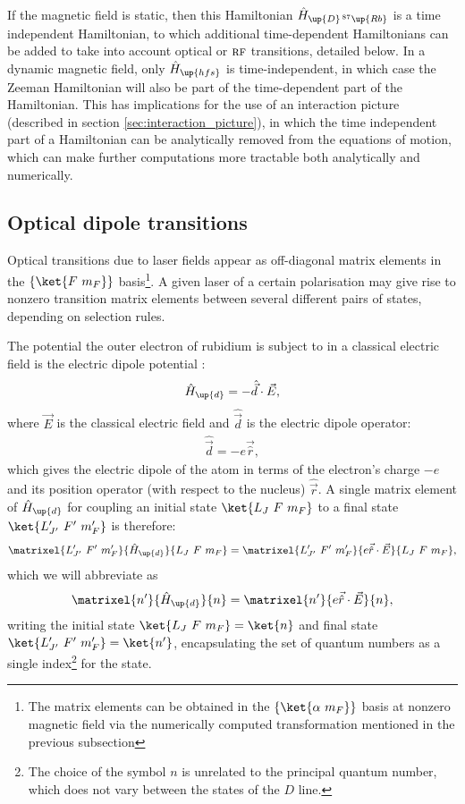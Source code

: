 If the magnetic field is static, then this Hamiltonian $\hat{H}_{\up{D}\,^{87}\up{Rb}}$ is a time independent Hamiltonian, to which additional time-dependent Hamiltonians can be added to take into account optical or $\textsc{rf}$ transitions, detailed below. In a dynamic magnetic field, only $\hat H_\up{hfs}$ is time-independent, in which case the Zeeman Hamiltonian will also be part of the time-dependent part of the Hamiltonian. This has implications for the use of an interaction picture (described in section \ref{sec:interaction_picture}), in which the time independent part of a Hamiltonian can be analytically removed from the equations of motion, which can make further computations more tractable both analytically and numerically.

\subsection{Optical dipole transitions}\label{sec:optical_dipole_transitions}

Optical transitions due to laser fields appear as off-diagonal matrix elements in the $\{\ket{F\ m_F}\}$ basis\footnote{The matrix elements can be obtained in the $\{\ket{\alpha\ m_F}\}$ basis at nonzero magnetic field via the numerically computed transformation mentioned in the previous subsection}. A given laser of a certain polarisation may give rise to nonzero transition matrix elements between several different pairs of states, depending on selection rules.

The potential the outer electron of rubidium is subject to in a classical electric field is the electric dipole potential \cite{metcalf_laser_1999, steck_quantum_2017}:
\begin{align}
\hat H_\up{d} = -\hat{\vec d}\cdot\vec E,
\end{align}
where $\vec E$ is the classical electric field and $\hat{\vec d}$ is the electric dipole operator:
\begin{align}
\hat{\vec d} = -e\vec{\hat r},
\end{align}
which gives the electric dipole of the atom in terms of the electron's charge $-e$ and its position operator (with respect to the nucleus) $\hat{\vec r}$. A single matrix element of $\hat H_\up{d}$ for coupling an initial state $\ket{L_J\ F\ m_F}$ to a final state $\ket{L^\prime_{J^\prime}\ F^\prime\ m_F^\prime}$ is therefore:
\begin{align}\label{eq:electric_dipole_potential}
\matrixel{L^\prime_{J^\prime}\ F^\prime\ m_F^\prime}{\hat H_\up{d}}{L_J\ F\ m_F} = 
\matrixel{L^\prime_{J^\prime}\ F^\prime\ m_F^\prime}{e\vec{\hat r}\cdot\vec E}{L_J\ F\ m_F},
\end{align}
which we will abbreviate as
\begin{align}
\matrixel{n^\prime}{\hat H_\up{d}}{n} = 
\matrixel{n^\prime}{e\vec{\hat r}\cdot\vec E}{n},
\end{align}
writing the initial state $\ket{L_J\ F\ m_F}=\ket{n}$ and final state $\ket{L^\prime_{J^\prime}\ F^\prime\ m_F^\prime}=\ket{n^\prime}$, encapsulating the set of quantum numbers as a single index\footnote{The choice of the symbol $n$ is unrelated to the principal quantum number, which does not vary between the states of the $D$ line.} for the state.

